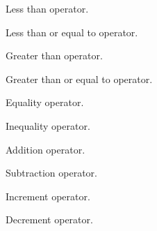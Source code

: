 Less than operator.

\label{wxtimeoperatorleq}


Less than or equal to operator.

\label{wxtimeoperatorge}


Greater than operator.

\label{wxtimeoperatorgeq}


Greater than or equal to operator.

\label{wxtimeoperatoreq}


Equality operator.

\label{wxtimeoperatorneq}


Inequality operator.

\label{wxtimeoperatorplus}


Addition operator.

\label{wxtimeoperatorminus}


Subtraction operator.

\label{wxtimeoperatorpluseq}


Increment operator.

\label{wxtimeoperatorminuseq}


Decrement operator.

